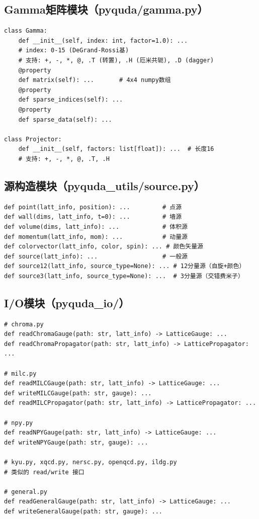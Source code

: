 \documentclass[12pt,a4paper]{ctexart}
\begin{document}
\subsection{Gamma矩阵模块（pyquda/gamma.py）}

\begin{lstlisting}[caption={Gamma矩阵接口}]
class Gamma:
    def __init__(self, index: int, factor=1.0): ...
    # index: 0-15 (DeGrand-Rossi基)
    # 支持: +, -, *, @, .T (转置), .H (厄米共轭), .D (dagger)
    @property
    def matrix(self): ...       # 4x4 numpy数组
    @property
    def sparse_indices(self): ...
    @property
    def sparse_data(self): ...

class Projector:
    def __init__(self, factors: list[float]): ...  # 长度16
    # 支持: +, -, *, @, .T, .H
\end{lstlisting}

\subsection{源构造模块（pyquda\_utils/source.py）}

\begin{lstlisting}[caption={源构造接口}]
def point(latt_info, position): ...         # 点源
def wall(dims, latt_info, t=0): ...         # 墙源
def volume(dims, latt_info): ...            # 体积源
def momentum(latt_info, mom): ...           # 动量源
def colorvector(latt_info, color, spin): ... # 颜色矢量源
def source(latt_info): ...                  # 一般源
def source12(latt_info, source_type=None): ... # 12分量源（自旋+颜色）
def source3(latt_info, source_type=None): ...  # 3分量源（交错费米子）
\end{lstlisting}

\subsection{I/O模块（pyquda\_io/）}

\begin{lstlisting}[caption={I/O接口}]
# chroma.py
def readChromaGauge(path: str, latt_info) -> LatticeGauge: ...
def readChromaPropagator(path: str, latt_info) -> LatticePropagator: ...

# milc.py
def readMILCGauge(path: str, latt_info) -> LatticeGauge: ...
def writeMILCGauge(path: str, gauge): ...
def readMILCPropagator(path: str, latt_info) -> LatticePropagator: ...

# npy.py
def readNPYGauge(path: str, latt_info) -> LatticeGauge: ...
def writeNPYGauge(path: str, gauge): ...

# kyu.py, xqcd.py, nersc.py, openqcd.py, ildg.py
# 类似的 read/write 接口

# general.py
def readGeneralGauge(path: str, latt_info) -> LatticeGauge: ...
def writeGeneralGauge(path: str, gauge): ...
\end{lstlisting}
\end{document}
